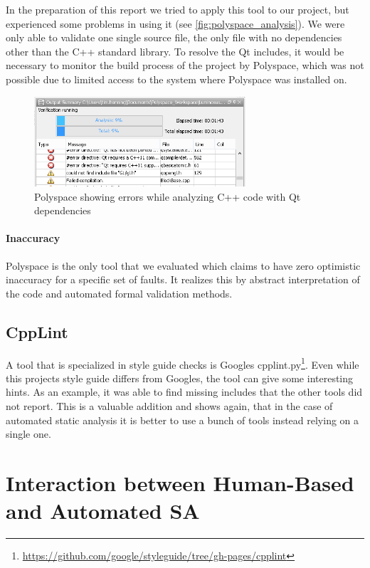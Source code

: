 \documentclass{scrreprt}
\begin{document}
In the preparation of this report we tried to apply this tool to our project, but experienced some problems in using it (see \vref{fig:polyspace_analysis}). We were only able to validate one single source file, the only file with no dependencies other than the C++ standard library. To resolve the Qt includes, it would be necessary to monitor the build process of the project by Polyspace, which was not possible due to limited access to the system where Polyspace was installed on.

\begin{figure}[h]
	\centering
	\includegraphics[width=0.7\textwidth]{img/polyspace_analysis}
	\caption[Polyspace Analysis]{Polyspace showing errors while analyzing C++ code with Qt dependencies}
	\label{fig:polyspace_analysis}
\end{figure}

\paragraph{Inaccuracy}

Polyspace is the only tool that we evaluated which claims to have zero optimistic inaccuracy for a specific set of faults. It realizes this by abstract interpretation of the code and automated formal validation methods.

\subsection{CppLint} 

A tool that is specialized in style guide checks is Googles cpplint.py\footnote{\url{https://github.com/google/styleguide/tree/gh-pages/cpplint}}. Even while this projects style guide differs from Googles, the tool can give some interesting hints. As an example, it was able to find missing includes that the other tools did not report. This is a valuable addition and shows again, that in the case of automated static analysis it is better to use a bunch of tools instead relying on a single one.

\section{Interaction between Human-Based and Automated SA}
\label{sec:human-based-vs-automated-sa}
\end{document}

